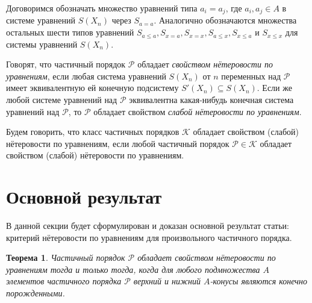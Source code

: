 \documentclass[12pt]{article}
\theoremstyle{break}
\newtheorem{Th}{Теорема}
\def\P{\mathcal{P}}
\begin{document}
		Договоримся обозначать множество уравнений типа $a_i=a_j$, где $a_i, a_j\in A$ в системе уравнений $S(X_n)$ через $S_{a=a}$. Аналогично обозначаются множества остальных шести типов уравнений $S_{a\leqslant a}, S_{x=a}, S_{x=x}, S_{a\leqslant x}, S_{x\leqslant a}$ и $ S_{x\leqslant x}$ для системы уравнений $S(X_n)$.
		
		Говорят, что частичный порядок $\P$ обладает \textit{свойством нётеровости по уравнениям}, если любая система уравнений $S(X_n)$ от $n$ переменных над $\P$ имеет эквивалентную ей конечную подсистему $S'(X_n) \subseteq S(X_n)$. Если же любой системе уравнений над $\P$ эквивалентна какая-нибудь конечная система уравнений над $\P$, то $\P$ обладает свойством \textit{слабой нётеровости по уравнениям}.
		
		Будем говорить, что класс частичных порядков $\mathcal{K}$ обладает свойством (слабой) нётеровости по уравнениям, если любой частичный порядок $\P \in \mathcal{K}$ обладает свойством (слабой) нётеровости по уравнениям.
		
	
	\section{Основной результат}
		В данной секции будет сформулирован и доказан основной результат статьи: критерий нётеровости по уравнениям для произвольного частичного порядка.

		\begin{Th}\label{criterion}
			Частичный порядок $\P$ обладает свойством нётеровости по уравнениям тогда и только тогда, когда для любого подмножества $A$ элементов частичного порядка $\P$ верхний и нижний $A$-конусы являются конечно порожденными.
		\end{Th}
\end{document}
